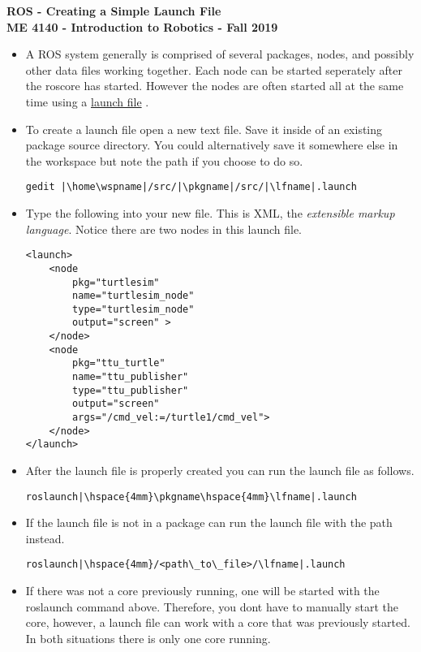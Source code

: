 \documentclass[12pt]{article}
\newcommand{\pkgname}{<package\_name>}
\newcommand{\wspname}{<workspace\_name>}
\newcommand{\lfname}{<launchfile\_name>}
\newcommand{\home}{\textasciitilde/}
\begin{document}
\thispagestyle{plain}

\begin{center}
   {\bf \Large ROS - Creating a Simple Launch File}\vspace{2mm} \\
   {\bf \large ME 4140 - Introduction to Robotics - Fall 2019} \\
\end{center}


\begin{itemize}
	
	\item A ROS system generally is comprised of several packages, nodes, and possibly other data files working together. Each node can be started seperately after the roscore has started. However the nodes are often started all at the same time using a  \href{http://wiki.ros.org/roslaunch} {launch file} .

	\item To create a launch file open a new text file. Save it inside of an existing package source directory. You could alternatively save it somewhere else in the workspace but note the path if you choose to do so.\\
	
\begin{verbatim}
gedit |\home\wspname|/src/|\pkgname|/src/|\lfname|.launch
\end{verbatim}
	 
	\item Type the following into your new file. This is XML, the {\it extensible markup language}. Notice there are two nodes in this launch file.
\begin{lstlisting}
<launch>
	<node 
		pkg="turtlesim" 
		name="turtlesim_node" 
		type="turtlesim_node"
		output="screen" >	
	</node>
	<node 
		pkg="ttu_turtle"
		name="ttu_publisher"  
		type="ttu_publisher"
		output="screen" 
		args="/cmd_vel:=/turtle1/cmd_vel">	
	</node>		
</launch>
\end{lstlisting}

	\item After the launch file is properly created you can run the launch file as follows.\\
\begin{verbatim}
roslaunch|\hspace{4mm}\pkgname\hspace{4mm}\lfname|.launch 
\end{verbatim}
	\item If the launch file is not in a package can run the launch file with the path instead.\\
\begin{verbatim}
roslaunch|\hspace{4mm}/<path\_to\_file>/\lfname|.launch 
\end{verbatim}

	\item If there was not a core previously running, one will be started with the roslaunch command above. Therefore, you dont have to manually start the core, however, a launch file can work with a core that was previously started. In both situations there is only one core running. 

	\end{itemize}
\end{document}
